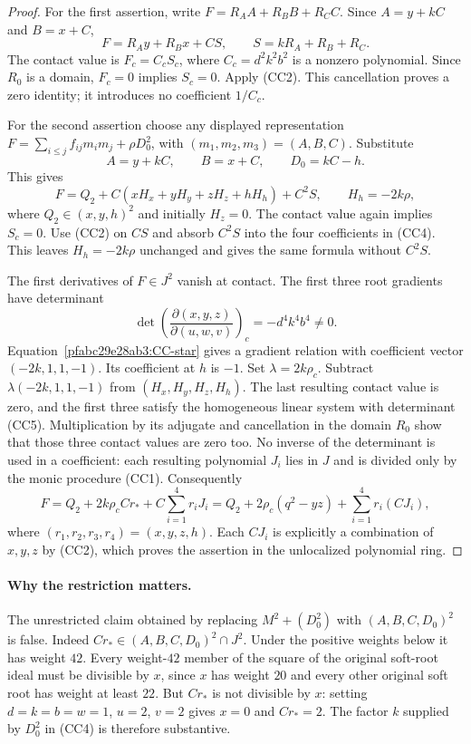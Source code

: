 \begin{proof}
For the first assertion, write $F=R_AA+R_BB+R_CC$. Since
$A=y+kC$ and $B=x+C$,
\[
 F=R_Ay+R_Bx+CS,\qquad S=kR_A+R_B+R_C.
\]
The contact value is $F_c=C_cS_c$, where $C_c=d^2k^2b^2$ is a nonzero
polynomial. Since $R_0$ is a domain, $F_c=0$ implies $S_c=0$.
Apply (CC2). This cancellation proves a zero identity; it introduces no
coefficient $1/C_c$.

For the second assertion choose any displayed representation
$F=\sum_{i\le j}f_{ij}m_im_j+\rho D_0^2$, with
$(m_1,m_2,m_3)=(A,B,C)$. Substitute
\[
 A=y+kC,\qquad B=x+C,\qquad D_0=kC-h.
\]
This gives
\[
 F=Q_2+C(xH_x+yH_y+zH_z+hH_h)+C^2S,\qquad H_h=-2k\rho,       \tag{CC4}
\]
where $Q_2\in(x,y,h)^2$ and initially $H_z=0$.
The contact value again implies $S_c=0$. Use (CC2) on $CS$ and absorb
$C^2S$ into the four coefficients in (CC4). This leaves $H_h=-2k\rho$
unchanged and gives the same formula without $C^2S$.

The first derivatives of $F\in J^2$ vanish at contact. The first three
root gradients have determinant
\[
 \det\left(\frac{\partial(x,y,z)}{\partial(u,w,v)}\right)_c
       =-d^4k^4b^4\ne0.                              \tag{CC5}
\]
Equation~\eqref{pfabc29e28ab3:CC-star} gives a gradient relation with coefficient vector
$(-2k,1,1,-1)$. Its coefficient at $h$ is $-1$.
Set $\lambda=2k\rho_c$. Subtract
$\lambda(-2k,1,1,-1)$ from $(H_x,H_y,H_z,H_h)$.
The last resulting contact value is zero, and the first three satisfy the
homogeneous linear system with determinant (CC5). Multiplication by its
adjugate and cancellation in the domain $R_0$ show that those three
contact values are zero too. No inverse of the determinant is used in a
coefficient: each resulting polynomial $J_i$ lies in $J$ and is divided
only by the monic procedure (CC1).
Consequently
\[
 F=Q_2+2k\rho_cCr_*+C\sum_{i=1}^4r_iJ_i
   =Q_2+2\rho_c(q^2-yz)+\sum_{i=1}^4r_i(CJ_i),          \tag{CC6}
\]
where $(r_1,r_2,r_3,r_4)=(x,y,z,h)$. Each $CJ_i$ is explicitly a
combination of $x,y,z$ by (CC2), which proves the assertion in the
unlocalized polynomial ring.
\end{proof}

\paragraph{Why the restriction matters.}
The unrestricted claim obtained by replacing $M^2+(D_0^2)$ with
$(A,B,C,D_0)^2$ is false. Indeed $Cr_*\in(A,B,C,D_0)^2\cap J^2$.
Under the positive weights below it has weight $42$. Every weight-$42$
member of the square of the original soft-root ideal must be divisible
by $x$, since $x$ has weight $20$ and every other original soft root has
weight at least $22$. But $Cr_*$ is not divisible by $x$: setting
$d=k=b=w=1$, $u=2$, $v=2$ gives $x=0$ and $Cr_*=2$.
The factor $k$ supplied by $D_0^2$ in (CC4) is therefore substantive.


